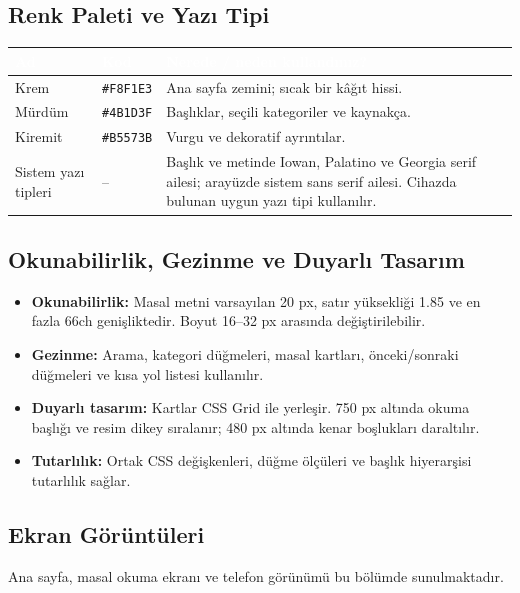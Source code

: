 \documentclass[12pt,a4paper]{article}
\begin{document}
\subsection{Renk Paleti ve Yazı Tipi}
\begin{center}
\begin{tabular}{@{}p{2.8cm}p{2.5cm}p{8cm}@{}}
\toprule
\rowcolor{ana}
\textcolor{white}{\textbf{Ad}} & \textcolor{white}{\textbf{Kod}} & \textcolor{white}{\textbf{Nerede / neden kullandınız?}}\\
\midrule
Krem & \texttt{\#F8F1E3} & Ana sayfa zemini; sıcak bir kâğıt hissi.\\
Mürdüm & \texttt{\#4B1D3F} & Başlıklar, seçili kategoriler ve kaynakça.\\
Kiremit & \texttt{\#B5573B} & Vurgu ve dekoratif ayrıntılar.\\
Sistem yazı tipleri & -- & Başlık ve metinde Iowan, Palatino ve Georgia serif ailesi; arayüzde sistem sans serif ailesi. Cihazda bulunan uygun yazı tipi kullanılır.\\
\bottomrule
\end{tabular}
\end{center}

\subsection{Okunabilirlik, Gezinme ve Duyarlı Tasarım}
\begin{itemize}
\item \textbf{Okunabilirlik:} Masal metni varsayılan 20 px, satır yüksekliği 1.85 ve en fazla 66ch genişliktedir. Boyut 16--32 px arasında değiştirilebilir.
\item \textbf{Gezinme:} Arama, kategori düğmeleri, masal kartları, önceki/sonraki düğmeleri ve kısa yol listesi kullanılır.
\item \textbf{Duyarlı tasarım:} Kartlar CSS Grid ile yerleşir. 750 px altında okuma başlığı ve resim dikey sıralanır; 480 px altında kenar boşlukları daraltılır.
\item \textbf{Tutarlılık:} Ortak CSS değişkenleri, düğme ölçüleri ve başlık hiyerarşisi tutarlılık sağlar.
\end{itemize}

\subsection{Ekran Görüntüleri}
Ana sayfa, masal okuma ekranı ve telefon görünümü bu bölümde sunulmaktadır.
\end{document}
